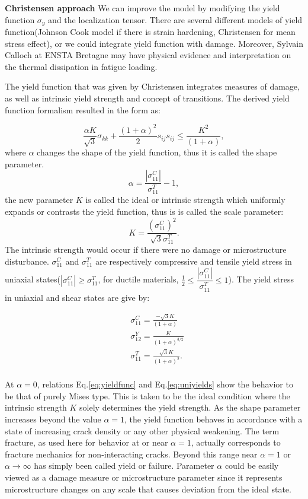 \documentclass[3p,times,procedia,number]{elsarticle}
\begin{document}
\textbf{Christensen approach}
We can improve the model by modifying the yield function $\sigma_y$ and the localization tensor. There are several different models of yield function(Johnson Cook model if there is strain hardening, Christensen for mean stress effect), or we could integrate yield function with damage. Moreover, Sylvain Calloch at ENSTA Bretagne may have physical evidence and interpretation on the thermal dissipation in fatigue loading. 

The yield function that was given by Christensen\cite{christensen2000yield} integrates measures of damage, as well as intrinsic yield strength and concept of transitions. The derived yield function formalism resulted in the form as:

\begin{equation}
	\frac{\alpha K}{\sqrt{3}}\sigma_{kk}+\frac{(1+\alpha)^2}{2}s_{ij}s_{ij}\leqslant\frac{K^2}{(1+\alpha)},
	\label{eq:yieldfunc}
\end{equation}
where $\alpha$ changes the shape of the yield function, thus it is called the shape parameter. 
$$\alpha=\frac{\left| \sigma_{11}^C\right| }{\sigma_{11}^T}-1,$$
the new parameter $K$ is called the ideal or intrinsic strength which uniformly expands or contrasts the yield function, thus is is called the scale parameter:
$$K=\frac{(\sigma_{11}^C)^2}{\sqrt{3}\sigma_{11}^T}.$$
The intrinsic strength would occur if there were no damage or microstructure disturbance. 
$\sigma_{11}^C$ and $\sigma_{11}^T$ are respectively compressive and tensile yield stress in uniaxial states($\left| \sigma_{11}^C\right| \geqslant\sigma_{11}^T$, for ductile materials, $\frac{1}{2}\leqslant\dfrac{\left| \sigma_{11}^C\right| }{\sigma_{11}^T}\leqslant 1$). The yield stress in uniaxial and shear states are give by:

\begin{equation}
	\begin{split}
		&\sigma_{11}^C=\frac{-\sqrt{3}K}{(1+\alpha)}\\
		&\sigma_{12}^Y=\frac{K}{(1+\alpha)^{3/2}} \\
		&\sigma_{11}^T=\frac{\sqrt{3}K}{(1+\alpha)^2}.\\
	\end{split}
	\label{eq:uniyields}
\end{equation}

At $\alpha=0$, relations Eq.\eqref{eq:yieldfunc} and Eq.\eqref{eq:uniyields} show the behavior to be that of purely Mises type. This is taken to be the ideal condition where the intrinsic strength $K$ solely determines the yield strength. As the shape parameter increases beyond the value $\alpha=1$, the yield function behaves in accordance with  a state of increasing crack density or any other physical weakening. The term fracture, as used here for behavior at or near $\alpha=1$, actually corresponds to fracture mechanics for non-interacting cracks. Beyond this range near $\alpha=1$ or $\alpha\to\infty$ has simply been called yield or failure. Parameter $\alpha$ could be easily viewed as a damage measure or microstructure parameter since it represents microstructure changes on any scale that causes deviation from the ideal state. 
\end{document}
